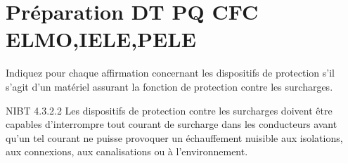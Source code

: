 \documentclass[a4paper,11pt,answers,addpoints]{exam}
\begin{document}
\unframedsolutions
\pointsinmargin
\bracketedpoints
	
\section*{Préparation DT PQ CFC ELMO,IELE,PELE}
\begin{questions}
\question
Indiquez pour chaque affirmation concernant les dispositifs de protection s'il s'agit d'un matériel assurant la fonction de protection contre les surcharges.


\begin{solution}
	NIBT 4.3.2.2 Les dispositifs de protection contre les surcharges doivent être capables d'interrompre tout courant de surcharge dans les conducteurs avant qu'un tel courant ne puisse provoquer un échauffement nuisible aux isolations, aux connexions, aux canalisations ou à l'environnement.
	

\end{solution}
\end{questions}
\end{document}
